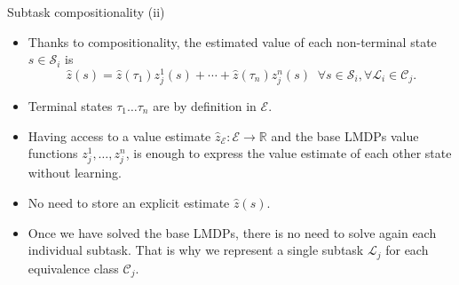 \documentclass{beamer}
\theoremstyle{mystyle}
\newcommand{\cC}{\mathcal{C}}
\newcommand{\cE}{\mathcal{E}}
\newcommand{\cL}{\mathcal{L}}
\newcommand{\cS}{\mathcal{S}}
\begin{document}
\begin{frame}{Subtask compositionality (ii)}


\begin{itemize}
    \item Thanks to compositionality, the estimated value of each non-terminal state $s\in\cS_i$ is
    \begin{equation*}
        \hat{z}(s)=\hat{z}(\tau_1)z_j^1(s)+\cdots+\hat{z}(\tau_n)z_j^n(s) \;\; \forall s\in\cS_i,\forall\cL_i\in\cC_j.
    \end{equation*}
    
    \item Terminal states $\tau_1 \dots \tau_n$ are by definition in $\cE$.
    
   \item Having access to a value estimate $\hat{z}_\cE:\cE\rightarrow\mathbb{R}$ and the base LMDPs value functions $z_j^1,\ldots,z_j^n$, is enough to express the value estimate of each other state without learning.
   
   \item No need to store an explicit estimate $\hat z(s)$.
   
   \item {\color{blue} Once we have solved the base LMDPs, there is no need to solve again each individual subtask}. That is why we represent a single subtask $\cL_j$ for each equivalence class $\cC_j$.
    
\end{itemize}

\end{frame}
\end{document}
